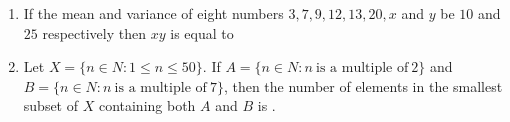 \documentclass[journal,12pt,onecolumn]{IEEEtran}
\theoremstyle{remark}
\begin{document}
\begin{enumerate}
\item  If the mean and variance of eight numbers $3, 7, 9, 12, 13, 20, x$ and $y$ be $10$ and $25$ respectively then $xy$ is equal to

\item Let $X = \{n \in N: 1 \leq n \leq 50\}$. If $A= \{n \in N: n \ \text{is a multiple of} \ 2\}$ and $B = \{n \in N: n \ \text{is a multiple of} \ 7\}$, then the number of elements in the smallest subset of $X$ containing both $A$ and $B$ is .









\end{enumerate}
\end{document}
